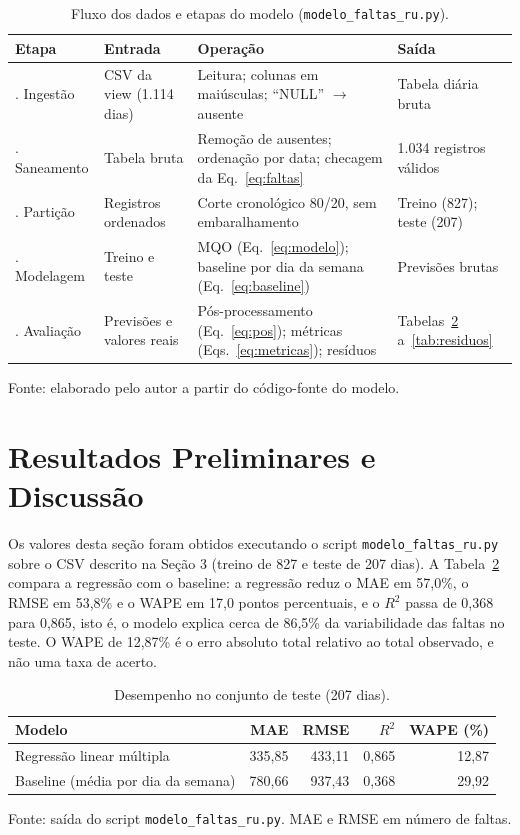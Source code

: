 \documentclass[11pt]{article}
\begin{document}
\begin{table}[htbp]
\centering
\small
\caption{Fluxo dos dados e etapas do modelo (\texttt{modelo\_faltas\_ru.py}).}
\label{tab:fluxo}
\begin{tabularx}{\textwidth}{@{}>{\raggedright\arraybackslash}p{}>{\raggedright\arraybackslash}p{}XX@{}}
\toprule
Etapa & Entrada & Operação & Saída \\
\midrule
1. Ingestão & CSV da view (1.114 dias) & Leitura; colunas em maiúsculas; ``NULL'' $\to$ ausente & Tabela diária bruta \\
2. Saneamento & Tabela bruta & Remoção de ausentes; ordenação por data; checagem da Eq.~\ref{eq:faltas} & 1.034 registros válidos \\
3. Partição & Registros ordenados & Corte cronológico 80/20, sem embaralhamento & Treino (827); teste (207) \\
4. Modelagem & Treino e teste & MQO (Eq.~\ref{eq:modelo}); baseline por dia da semana (Eq.~\ref{eq:baseline}) & Previsões brutas \\
5. Avaliação & Previsões e valores reais & Pós-processamento (Eq.~\ref{eq:pos}); métricas (Eqs.~\ref{eq:metricas}); resíduos & Tabelas~\ref{tab:desempenho} a~\ref{tab:residuos} \\
\bottomrule
\end{tabularx}
\begin{flushleft}\footnotesize Fonte: elaborado pelo autor a partir do código-fonte do modelo.\end{flushleft}
\end{table}

\section{Resultados Preliminares e Discussão}

Os valores desta seção foram obtidos executando o script \texttt{modelo\_faltas\_ru.py} sobre o CSV descrito na Seção 3 (treino de 827 e teste de 207 dias). A Tabela~\ref{tab:desempenho} compara a regressão com o baseline: a regressão reduz o MAE em 57,0\%, o RMSE em 53,8\% e o WAPE em 17,0 pontos percentuais, e o $R^2$ passa de 0,368 para 0,865, isto é, o modelo explica cerca de 86,5\% da variabilidade das faltas no teste. O WAPE de 12,87\% é o erro absoluto total relativo ao total observado, e não uma taxa de acerto.

\begin{table}[htbp]
\centering
\small
\caption{Desempenho no conjunto de teste (207 dias).}
\label{tab:desempenho}
\begin{tabular}{@{}lrrrr@{}}
\toprule
Modelo & MAE & RMSE & $R^2$ & WAPE (\%) \\
\midrule
Regressão linear múltipla & 335,85 & 433,11 & 0,865 & 12,87 \\
Baseline (média por dia da semana) & 780,66 & 937,43 & 0,368 & 29,92 \\
\bottomrule
\end{tabular}
\begin{flushleft}\footnotesize Fonte: saída do script \texttt{modelo\_faltas\_ru.py}. MAE e RMSE em número de faltas.\end{flushleft}
\end{table}
\end{document}
